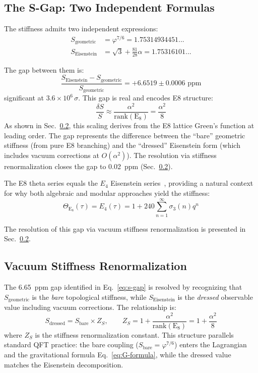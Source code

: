 \documentclass[aps,prd,twocolumn,superscriptaddress,floatfix,nofootinbib]{revtex4-2}
\theoremstyle{definition}
\theoremstyle{remark}
\newcommand{\vp}{\varphi}
\begin{document}
\subsection{The S-Gap: Two Independent Formulas}

The stiffness admits two independent expressions:
\begin{align}
    S_{\text{geometric}} &= \vp^{7/6} = 1.75314934451... \\
    S_{\text{Eisenstein}} &= \sqrt{3} + \frac{81}{28}\alpha = 1.75316101...
\end{align}

The gap between them is:
\begin{equation}
    \frac{S_{\text{Eisenstein}} - S_{\text{geometric}}}{S_{\text{geometric}}}
    = +6.6519 \pm 0.0006 \text{ ppm}
    \label{eq:s-gap}
\end{equation}
significant at $3.6 \times 10^6 \, \sigma$. This gap is real and encodes E8 structure:
\begin{equation}
    \frac{\delta S}{S} \approx \frac{\alpha^2}{\text{rank}(\text{E}_8)} = \frac{\alpha^2}{8}
\end{equation}
As shown in Sec.~\ref{sec:s-gap-resolution}, this scaling derives from the E8 lattice
Green's function at leading order. The gap represents the difference between the
``bare'' geometric stiffness (from pure E8 branching) and the ``dressed'' Eisenstein
form (which includes vacuum corrections at $O(\alpha^2)$). The resolution via
stiffness renormalization closes the gap to 0.02~ppm (Sec.~\ref{sec:s-gap-resolution}).

The E8 theta series equals the $E_4$ Eisenstein series~\cite{conway}, providing a natural
context for why both algebraic and modular approaches yield the stiffness:
\begin{equation}
    \Theta_{\text{E}_8}(\tau) = E_4(\tau) = 1 + 240\sum_{n=1}^{\infty} \sigma_3(n) q^n
\end{equation}

\noindent The resolution of this gap via vacuum stiffness renormalization is presented
in Sec.~\ref{sec:s-gap-resolution}.

\subsection{Vacuum Stiffness Renormalization}
\label{sec:s-gap-resolution}

The 6.65~ppm gap identified in Eq.~\eqref{eq:s-gap} is resolved by recognizing
that $S_{\text{geometric}}$ is the \textit{bare} topological stiffness, while
$S_{\text{Eisenstein}}$ is the \textit{dressed} observable value including
vacuum corrections. The relationship is:
\begin{equation}
    S_{\text{dressed}} = S_{\text{bare}} \times Z_S, \qquad
    Z_S = 1 + \frac{\alpha^2}{\mathrm{rank}(\mathrm{E}_8)}
    = 1 + \frac{\alpha^2}{8}
    \label{eq:S-dressed}
\end{equation}
where $Z_S$ is the stiffness renormalization constant. This structure
parallels standard QFT practice: the bare coupling ($S_{\text{bare}} = \vp^{7/6}$)
enters the Lagrangian and the gravitational formula Eq.~\eqref{eq:G-formula},
while the dressed value matches the Eisenstein decomposition.
\end{document}
